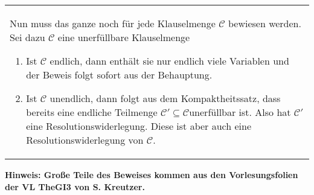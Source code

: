 \documentclass[a4paper,10pt]{article}
\newcommand{\tabspace}{15cm}
\begin{document}
\begin{tabular}{@{} p{\tabspace}}
Nun muss das ganze noch für jede Klauselmenge $\mathcal{C}$ bewiesen werden. Sei dazu $\mathcal{C}$ eine unerfüllbare Klauselmenge
\begin{enumerate}
	\item Ist $\mathcal{C}$ endlich, dann enthält sie nur endlich viele Variablen und der Beweis folgt sofort aus der Behauptung. 
	\item Ist $\mathcal{C}$ unendlich, dann folgt aus dem Kompaktheitssatz, dass bereits eine endliche Teilmenge $\mathcal{C}'\subseteq \mathcal{C} $unerfüllbar ist. Also hat $\mathcal{C}'$ eine Resolutionswiderlegung. Diese ist aber auch eine Resolutionswiderlegung von $\mathcal{C}$.	
\end{enumerate}
\end{tabular}

\textbf{Hinweis: Große Teile des Beweises kommen aus den Vorlesungsfolien der VL TheGI3 von S. Kreutzer. }
\newpage
\end{document}
